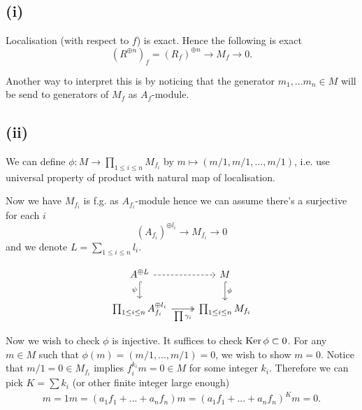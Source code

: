 \subsection{(i)} Localisation (with respect to $f$) is exact. Hence the following is exact
\[(R^{\oplus n})_f=(R_f)^{\oplus n}\to M_f\to 0.\]

Another way to interpret this is by noticing that the generator $m_1,...m_n\in M$ will be send to generators of $M_f$ as $A_f$-module.

\subsection{(ii)} We can define $\phi: M\to \prod_{1\leq i\leq n}M_{f_i}$ by $m\mapsto (m/1,m/1,...,m/1)$, i.e. use universal property of product with natural map of localisation. 

Now we have $M_{f_i}$ is f.g. as $A_{f_i}$-module hence we can assume there's a surjective for each $i$ 
\[(A_{f_i})^{\oplus l_i}\to M_{f_i}\to 0\] and we denote $L=\sum_{1\leq i\leq n} l_i$. 

\[\begin{tikzcd}
	{A^{\oplus L}} & M \\
	{\prod_{1\leq i\leq n}A_{f_i}^{\oplus l_i}} & {\prod_{1\leq i\leq n}M_{f_i}}
	\arrow[dashed, from=1-1, to=1-2]
	\arrow["\psi"', hook, from=1-1, to=2-1]
	\arrow["\phi", hook, from=1-2, to=2-2]
	\arrow["{\prod \gamma_i}"', two heads, from=2-1, to=2-2]
\end{tikzcd}\]

Now we wish to check $\phi$ is injective. It suffices to check $\operatorname{Ker} \phi\subset 0$. For any $m\in M$ such that $\phi(m)=(m/1,...,m/1)=0$, we wish to show $m=0$. Notice that $m/1=0\in M_{f_i}$ implies $f_i^{k_i}m=0\in M$ for some integer $k_i$. Therefore we can pick $K=\sum k_i$ (or other finite integer large enough)
\begin{align*}
    m=1m=(a_1f_1+...+a_nf_n)m=(a_1f_1+...+a_nf_n)^{K}m=0.
\end{align*}

